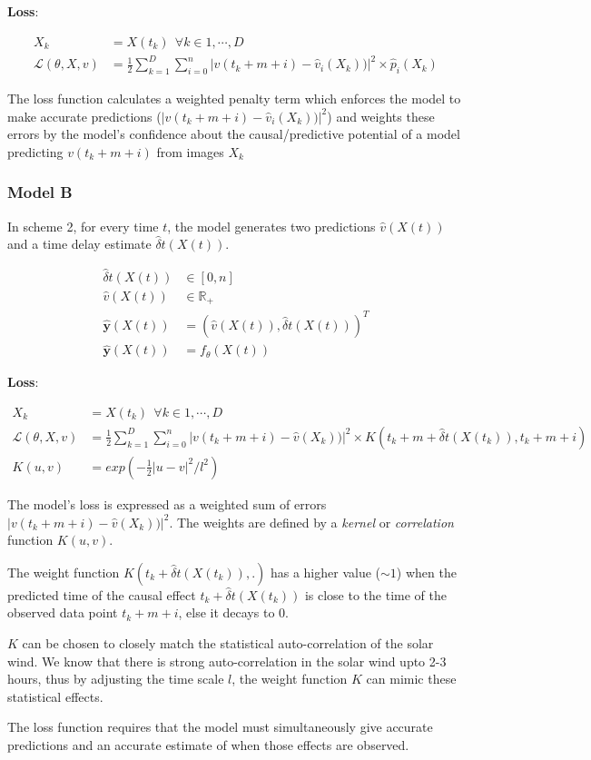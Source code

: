 \documentclass[]{article}
\theoremstyle{definition}
\begin{document}
\textbf{Loss}: 

\begin{align*}
    X_{k}                     & = { X(t_{k}) } \ \ \forall k \in {1, \cdots, D} \\
    \mathcal{L}(\theta, X, v) & = \frac{1}{2} \sum_{k = 1}^{D}{\sum_{i = 0}^{n}{|v(t_{k}+m+i) - \hat{v}_{i}(X_k))|^{2} \times \hat{p}_{i}(X_{k})}}
\end{align*}

The loss function calculates a weighted penalty term which enforces the model to make accurate predictions ($|v(t_{k}+m+i) - \hat{v}_{i}(X_k))|^{2}$) and weights these errors by the model's confidence about the causal/predictive potential of a model predicting $v(t_{k}+m+i)$ from images $X_k$

\subsubsection*{Model B}

In scheme 2, for every time $t$, the model generates two predictions $\hat{v}(X(t))$ and a time delay estimate $\hat{\delta}t(X(t))$.

\begin{align*}
    \hat{\delta}t(X(t))    & \in [0, n] \\ 
    \hat{v}(X(t))          & \in \mathbb{R}_{+}\\
    \mathbf{\hat{y}}(X(t)) & =   (\hat{v}(X(t)), \hat{\delta}t(X(t)))^T\\
    \mathbf{\hat{y}}(X(t)) & =   f_{\theta}(X(t))
\end{align*}

\textbf{Loss}:

\begin{align*}
    X_{k}                     & = { X(t_{k}) } \ \ \forall k \in {1, \cdots, D} \\
    \mathcal{L}(\theta, X, v) & = \frac{1}{2} \sum_{k = 1}^{D}{\sum_{i = 0}^{n}{|v(t_{k}+m+i) - \hat{v}(X_k))|^{2} \times K(t_{k} + m + \hat{\delta}t(X(t_k)), t_{k}+m+i) }} \\
    K(u, v)                   & = exp(-\frac{1}{2}|u-v|^{2}/l^2) 
\end{align*}


The model's loss is expressed as a weighted sum of errors $|v(t_{k}+m+i) - \hat{v}(X_k))|^{2}$. The weights are defined by a \emph{kernel} or \emph{correlation} function $K(u, v)$. 

The weight function $K(t_{k} + \hat{\delta}t(X(t_k)),.)$ has a higher value ($\sim 1$) when the predicted time of the causal effect $t_{k} + \hat{\delta}t(X(t_k))$ is close to the time of the observed data point $t_{k}+m+i$, else it decays to $0$.

$K$ can be chosen to closely match the statistical auto-correlation of the solar wind. We know that there is strong auto-correlation in the solar wind upto 2-3 hours, thus by adjusting the time scale $l$, the weight function $K$ can mimic these statistical effects.

The loss function requires that the model must simultaneously give accurate predictions and an accurate estimate of when those effects are observed. 
\end{document}

